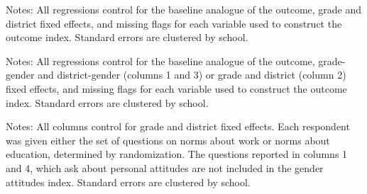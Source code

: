 \documentclass[letterpaper,12pt,pdftex]{article}
\begin{document}
\clearpage
\newpage

\begin{table}
	\caption{Gender-specific treatment effects on attitudes, aspirations, and behavior (Endline 1)}
	\label{tab_el1_primary_combined}
	\begin{center}
		
		\end{center}
\flushleft \footnotesize{Notes: All regressions control for the baseline analogue of the outcome, grade and district fixed effects, and missing flags for each variable used to construct the outcome index. Standard errors are clustered by school.}
\end{table}

\clearpage
\newpage


	\begin{table}
		\tabcolsep=2.8pt
		\caption{Heterogeneous effects by parent attitudes (Endline 1)}
		\label{tab_el1_heterog_patt}
		\vspace{.4cm}
		\begin{center}
			\small
			
		\end{center}
		\flushleft \footnotesize {Notes: All regressions control for the baseline analogue of the outcome, grade-gender and district-gender (columns 1 and 3) or grade and district (column 2) fixed effects, and missing flags for each variable used to construct the outcome index. Standard errors are clustered by school.}
	\end{table}
\restoregeometry
\clearpage
\newpage


\begin{landscape}
	\begin{table}
		\tabcolsep=2.5pt
		\caption{Treatment effects on perceptions of social norms (Endline 1)}
		\label{tab_social_norms}
		\vspace{.4cm}
		\begin{center}
			\small
			
		\end{center}
		\flushleft \footnotesize{Notes: All columns control for grade and district fixed effects. Each respondent was given either the set of questions on norms about work or norms about education, determined by randomization. The questions reported in columns 1 and 4, which ask about personal attitudes are not included in the gender attitudes index. Standard errors are clustered by school.}
	\end{table}
\end{landscape}
\clearpage
\end{document}
